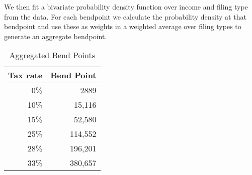 \documentclass[12pt]{report}
\theoremstyle{definition}
\begin{document}
      We then fit a bivariate probability density function over income and filing type from the data.  For each bendpoint we calculate the probability density at that bendpoint and use these as weights in a weighted average over filing types to generate an aggregate bendpoint.
      \begin{table}[ht]
        \caption{Aggregated Bend Points}
        \label{Calib_Bend_Tab2}
        \centering
        \begin{tabular}{|r|r|} \hline 
          Tax rate & Bend Point \\ \hline 
          0\% & 2889 \\ \hline 
          10\% & 15,116 \\ \hline 
          15\% & 52,580 \\ \hline 
          25\% & 114,552 \\ \hline 
          28\% & 196,201 \\ \hline 
          33\% & 380,657 \\ \hline 
        \end{tabular}
      \end{table}

\clearpage

%  

\printindex
\end{document}

